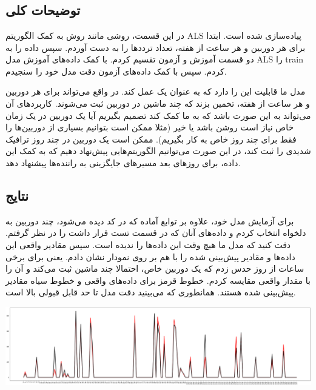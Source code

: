 \section{}

\subsection{توضیحات کلی}

در این قسمت، روشی مانند روش 
به کمک الگوریتم 
ALS
پیاده‌سازی شده است. ابتدا برای هر دوربین و هر ساعت از هفته، تعداد ترددها را به دست آوردم. سپس 
داده را به دو قسمت آموزش و آزمون تقسیم کردم. با کمک داده‌های آموزش مدل 
ALS
را 
train
کردم. سپس با کمک داده‌های آزمون دقت مدل خود را سنجیدم. 

مدل ما قابلیت این را دارد که به عنوان یک 
عمل کند. در واقع می‌تواند برای هر دوربین و هر ساعت از هفته، تخمین بزند که چند 
ماشین در دوربین ثبت می‌شوند. کاربرد‌های آن می‌تواند به این صورت باشد که به ما کمک 
کند تصمیم بگیریم آیا یک دوربین در یک زمان خاص نیاز است روشن باشد یا خیر (مثلا 
ممکن است بتوانیم بسیاری از دوربین‌ها را فقط برای چند روز خاص به کار 
بگیریم). 
ممکن است یک دوربین در چند روز ترافیک شدیدی را ثبت کند، در این صورت می‌توانیم 
الگوریتم‌هایی پیش‌نهاد دهیم که به کمک این داده، برای روز‌های بعد مسیر‌های جایگزینی 
به راننده‌ها پیشنهاد دهد. 


\subsection{نتایج}

برای آزمایش مدل خود، علاوه بر توابع آماده که در کد دیده‌ می‌شود، چند دوربین به 
دلخواه انتخاب کردم و داده‌های آنان که در قسمت تست قرار داشت را در نظر گرفتم. 
دقت کنید که مدل ما هیچ وقت این داده‌ها را ندیده‌ است. سپس مقادیر واقعی این داده‌ها 
و مقادیر پیش‌بینی شده را با هم بر روی نمودار نشان دادم. یعنی برای برخی ساعات از روز 
حدس زدم که یک دوربین خاص، احتمالا چند ماشین ثبت می‌کند و 
آن را با مقدار واقعی مقایسه کردم. خطوط قرمز برای داده‌های واقعی و خطوط سیاه مقادیر پیش‌بینی شده هستند. همانطوری که می‌بینید دقت مدل تا حد قابل قبولی بالا است.

\includegraphics[scale=0.2]{images/CF_ALS/100.png}

